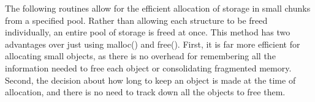 The following routines allow for the efficient allocation of storage in small chunks from a specified pool. Rather than allowing each structure to be freed individually, an entire pool of storage is freed at once. This method has two advantages over just using malloc() and free(). First, it is far more efficient for allocating small objects, as there is no overhead for remembering all the information needed to free each object or consolidating fragmented memory. Second, the decision about how long to keep an object is made at the time of allocation, and there is no need to track down all the objects to free them. 